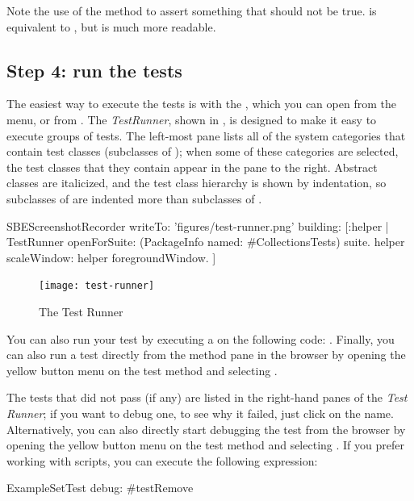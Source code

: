 \documentclass[a4paper,10pt,twoside]{book}
\begin{document}
\noindent
Note the use of the method  to assert something that should not be true.
 is equivalent to , but is much more readable.
\subsection{Step 4: run the tests}

The easiest way to execute the tests is with the \sunit {}, which you can open from the  menu, or from .
The \emph{TestRunner}, shown in , is designed to make it easy to execute groups of tests.
The left-most pane lists all of the system categories that contain test classes (\ie  subclasses of ); when some of these categories are selected, the test classes that they contain appear in the pane to the right.
Abstract classes are italicized, and the test class hierarchy is shown by indentation, so subclasses of  are indented more than subclasses of .

\begin{ExecuteSmalltalkScript}
SBEScreenshotRecorder writeTo: 'figures/test-runner.png' building: [:helper |
	TestRunner openForSuite: (PackageInfo named: #CollectionsTests) suite.
	helper scaleWindow: helper foregroundWindow.
]
\end{ExecuteSmalltalkScript}
\begin{figure}[tbh]
  \begin{center}
	\texttt{[image: test-runner]}
	\caption{The \squeak \sunit Test Runner}
	\label{fig:test-runner}
  \end{center}
\end{figure}



You can also run your test by executing a  on the following code:
. 
Finally, you can also run a test directly from the method pane in the browser by opening the yellow button menu on the test method and selecting .


The tests that did not pass (if any) are listed in the right-hand panes of the \emph{Test Runner}; if you want to debug one, to see why it failed, just click on the name.
Alternatively, you can also directly start debugging the test from the browser by opening the yellow button menu on the test method and selecting .
If you prefer working with scripts, you can execute the following expression:
\begin{code}{}
ExampleSetTest debug: #testRemove
\end{code}
\end{document}
